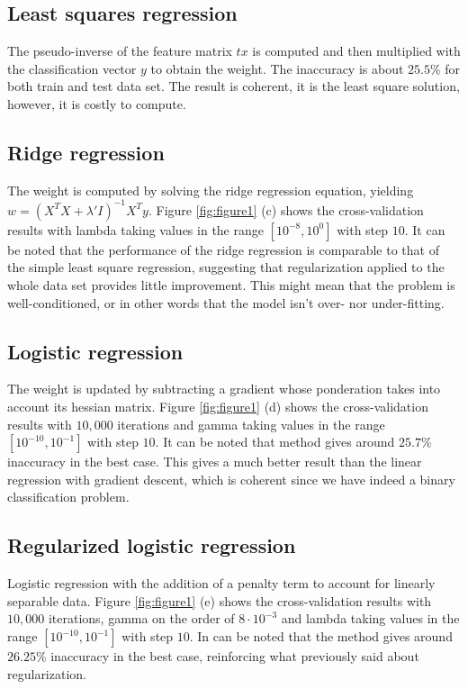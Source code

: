 \documentclass[10pt,conference,compsocconf]{IEEEtran}
\begin{document}
\subsection{Least squares regression}
The pseudo-inverse of the feature matrix $tx$ is computed and then multiplied with the classification vector $y$ to obtain the weight.
The inaccuracy is about $25.5$\% for both train and test data set. The result
is coherent, it is the least square solution, however, it is costly to compute.

\subsection{Ridge regression}
The weight is computed by solving the ridge regression equation, yielding $w = (X^{T}X + \lambda'I)^{-1}X^{T}y$.
Figure \ref{fig:figure1} (c) shows the cross-validation results with lambda taking values in the range $[10^{-8}, 10^{0}]$ with step $10$. It can be noted that the performance of the ridge regression is comparable to that of the simple least square regression, suggesting that regularization applied to the whole data set provides little improvement. This might mean that the problem is well-conditioned, or in other words that the model isn't over- nor under-fitting.

\subsection{Logistic regression}
The weight is updated by subtracting a gradient whose ponderation takes into %
account its hessian matrix. Figure \ref{fig:figure1} (d) shows the
cross-validation results with $10,000$ iterations and gamma taking values in the
range $[10^{-10}, 10^{-1}]$ with step $10$. It can be noted that method gives
around $25.7$\% inaccuracy in the best case. This gives a much better result than
the linear regression with gradient descent, which is coherent since we have
indeed a binary classification problem.

\subsection{Regularized logistic regression}
Logistic regression with the addition of a penalty term to account for linearly separable data. Figure \ref{fig:figure1} (e) shows the cross-validation results with $10,000$ iterations, gamma on the order of $8 \cdot 10^{-3}$ and lambda taking values in the range $[10^{-10}, 10^{-1}]$ with step $10$. In can be noted that the method gives around $26.25$\% inaccuracy in the best case, reinforcing what previously said about regularization.
\end{document}
